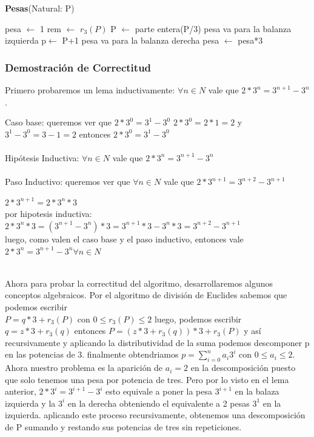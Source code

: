 \documentclass[spanish,12pt]{article}
\begin{document}
\begin{algorithm}[H]{\textbf{Pesas}(Natural: P)}
	\begin{algorithmic}[1]
		\State pesa $\gets$ 1
		 	\State rem $\gets$ $r_3 (P)$
	    		\State P $\gets $ parte entera(P/3)
	    			\State pesa va para la balanza izquierda    			\Else
	    				\State p$\gets$ P+1
	    				\State pesa va para la balanza derecha
				\EndIf
			\EndIf
			\State pesa $\gets$ pesa*3
		\endWhile
	\end{algorithmic}
\end{algorithm}



\subsubsection{Demostración de Correctitud}

Primero probaremos un lema inductivamente:
$\forall n \in N$ vale que  $2*3^{n} = 3^{n+1}-3^{n}$.

Caso base:
queremos ver que $2*3^{0} = 3^{1}-3^{0}$
$2*3^0 = 2*1=2$ y $3^1-3^0= 3-1=2$ entonces $2*3^{0} = 3^{1}-3^{0}$
\\
\\
Hipótesis Inductiva:
$\forall n \in N$ vale que  $2*3^{n} = 3^{n+1}-3^{n}$
\\
\\
Paso Inductivo:
queremos ver que $\forall n \in N$ vale que  $2*3^{n+1} = 3^{n+2}-3^{n+1}$

$2*3^{n+1} = 2*3^{n}*3 $
\\
 por hipotesis inductiva: $2*3^{n}*3 = (3^{n+1}-3^{n})*3 = 3^{n+1}*3 - 3^{n}*3= 3^{n+2}-3^{n+1} $
\\
luego, como valen el caso base y el paso inductivo, entonces vale $2*3^{n} = 3^{n+1}-3^{n} \forall n \in N $

\\
Ahora para probar la correctitud del algoritmo, desarrollaremos algunos conceptos algebraicos.
Por el algoritmo de división de Euclides sabemos que podemos escribir \\  $P= q*3+ r_{3}(P)$ con $0\leq r_{3}(P) \leq 2 $ luego, podemos escribir $q= z*3 + r_{3}(q)$ entonces $P= (z*3 + r_{3}(q))*3 +r_{3}(P)$ y así recursivamente y aplicando la distributividad de la suma podemos descomponer p en las potencias de 3. finalmente obtendriamos $p= \sum_{i=0}^{n}{a_i 3^{i}} $ con $0 \leq a_i \leq 2$.
Ahora nuestro problema es la aparición de $a_i=2$ en la descomposición puesto que solo tenemos una pesa por potencia de tres. Pero por lo visto en el lema anterior, $2*3^{i}= 3^{i+1}-3^{i}$ esto equivale a poner la pesa $3^{i+1}$ en la balaza izquierda y la $3^{i}$ en la derecha obteniendo el equivalente a 2 pesas $3^{1}$ en la izquierda. aplicando este proceso recursivamente, obtenemos  una descomposición de P sumando y restando sus potencias de tres sin repeticiones.
\end{document}
